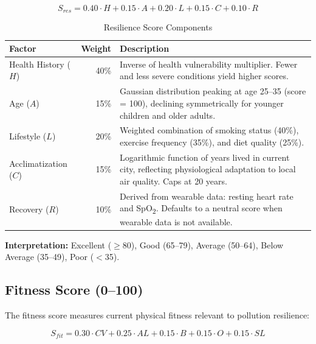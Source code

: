\documentclass[12pt,a4paper]{report}
\begin{document}
\begin{equation}
  S_{res} = 0.40 \cdot H + 0.15 \cdot A + 0.20 \cdot L + 0.15 \cdot C + 0.10 \cdot R
  \label{eq:resilience}
\end{equation}

\begin{table}[H]
\centering
\caption{Resilience Score Components}
\label{tab:resilience_factors}
\begin{tabularx}{\textwidth}{lrX}
\toprule
\textbf{Factor} & \textbf{Weight} & \textbf{Description} \\
\midrule
Health History ($H$)  & 40\% & Inverse of health vulnerability multiplier. Fewer and less severe conditions yield higher scores. \\
Age ($A$)             & 15\% & Gaussian distribution peaking at age 25--35 (score = 100), declining symmetrically for younger children and older adults. \\
Lifestyle ($L$)       & 20\% & Weighted combination of smoking status (40\%), exercise frequency (35\%), and diet quality (25\%). \\
Acclimatization ($C$) & 15\% & Logarithmic function of years lived in current city, reflecting physiological adaptation to local air quality. Caps at 20 years. \\
Recovery ($R$)        & 10\% & Derived from wearable data: resting heart rate and SpO\textsubscript{2}. Defaults to a neutral score when wearable data is not available. \\
\bottomrule
\end{tabularx}
\end{table}

\textbf{Interpretation:} Excellent ($\geq$80), Good (65--79), Average (50--64), Below Average (35--49), Poor ($<$35).

\subsection{Fitness Score (0--100)}

The fitness score measures current physical fitness relevant to pollution resilience:

\begin{equation}
  S_{fit} = 0.30 \cdot CV + 0.25 \cdot AL + 0.15 \cdot B + 0.15 \cdot O + 0.15 \cdot SL
  \label{eq:fitness}
\end{equation}
\end{document}

